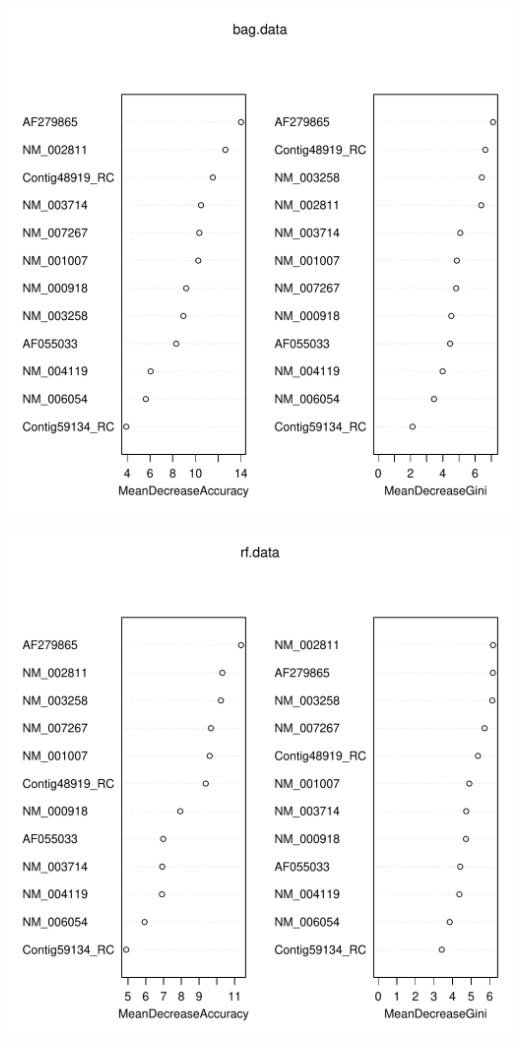 \documentclass[11pt, a4paper]{article}
\begin{document}
\includegraphics[scale=0.6]{bag_data.pdf}

\includegraphics[scale=0.6]{rf_data.pdf}
\end{document}
